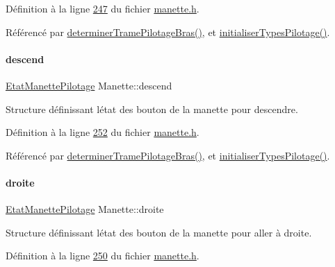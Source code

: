 Définition à la ligne \hyperlink{manette_8h_source_l00247}{247} du fichier \hyperlink{manette_8h_source}{manette.\+h}.



Référencé par \hyperlink{manette_8cpp_source_l00375}{determiner\+Trame\+Pilotage\+Bras()}, et \hyperlink{manette_8cpp_source_l00040}{initialiser\+Types\+Pilotage()}.

\mbox{\label{class_manette_a95e7f41f1e15f01d7530062801817304}} 
\paragraph{\texorpdfstring{descend}{descend}}
{\footnotesize\ttfamily \hyperlink{struct_etat_manette_pilotage}{Etat\+Manette\+Pilotage} Manette\+::descend\hspace{0.3cm}{\ttfamily [private]}}



Structure définissant l\textquotesingle{}état des bouton de la manette pour descendre. 



Définition à la ligne \hyperlink{manette_8h_source_l00252}{252} du fichier \hyperlink{manette_8h_source}{manette.\+h}.



Référencé par \hyperlink{manette_8cpp_source_l00375}{determiner\+Trame\+Pilotage\+Bras()}, et \hyperlink{manette_8cpp_source_l00040}{initialiser\+Types\+Pilotage()}.

\mbox{\label{class_manette_a40a2dc8420742b04c3eee14e477992b1}} 
\paragraph{\texorpdfstring{droite}{droite}}
{\footnotesize\ttfamily \hyperlink{struct_etat_manette_pilotage}{Etat\+Manette\+Pilotage} Manette\+::droite\hspace{0.3cm}{\ttfamily [private]}}



Structure définissant l\textquotesingle{}état des bouton de la manette pour aller à droite. 



Définition à la ligne \hyperlink{manette_8h_source_l00250}{250} du fichier \hyperlink{manette_8h_source}{manette.\+h}.



